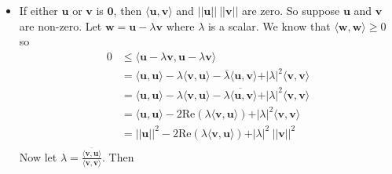 \documentclass{report}
\begin{document}

\begin{myproof}
    \begin{itemize}
        \item If either $\mathbf{u}$ or $\mathbf{v}$ is $\mathbf{0}$, then $\langle \mathbf{u}, \mathbf{v} \rangle$ and $\vert \vert \mathbf{u} \vert \vert \ \vert \vert \mathbf{v} \vert \vert$ are zero. So suppose $ \mathbf{u}$ and $\mathbf{v}$ are non-zero. Let $\mathbf{w} = \mathbf{u} - \lambda \mathbf{v}$ where $ \lambda $ is a scalar. We know that $ \langle \mathbf{w}, \mathbf{w} \rangle \ge 0 $ so
            \[
            \begin{aligned}
                0 & \le \langle \mathbf{u} - \lambda \mathbf{v}, \mathbf{u} - \lambda \mathbf{v} \rangle \\
                  &  = \langle \mathbf{u}, \mathbf{u} \rangle - \lambda \langle \mathbf{v}, \mathbf{u} \rangle - \overline{ \lambda } \langle \mathbf{u}, \mathbf{v} \rangle + \vert \lambda \vert ^2 \langle \mathbf{v}, \mathbf{v} \rangle \\
                   & = \langle \mathbf{u}, \mathbf{u} \rangle - \lambda \langle \mathbf{v}, \mathbf{u} \rangle - \overline{ \lambda  \langle \mathbf{u}, \mathbf{v} \rangle} + \vert \lambda \vert ^2 \langle \mathbf{v}, \mathbf{v} \rangle \\
                 & = \langle \mathbf{u}, \mathbf{u} \rangle - 2 \mathrm{Re}(\lambda \langle \mathbf{v}, \mathbf{u} \rangle) + \vert \lambda \vert ^2 \langle \mathbf{v}, \mathbf{v} \rangle \\
                 & = \vert \vert \mathbf{u} \vert \vert ^2 - 2 \mathrm{Re}(\lambda \langle \mathbf{v}, \mathbf{u} \rangle) + \vert \lambda \vert ^2 \ \vert \vert \mathbf{v} \vert \vert ^2 \\
            \end{aligned}
            \]
            Now let $ \lambda = \frac{\overline{ \langle \mathbf{v}, \mathbf{u} \rangle}}{\langle \mathbf{v}, \mathbf{v} \rangle}$. Then \\

\end{itemize}
\end{myproof}
\end{document}
